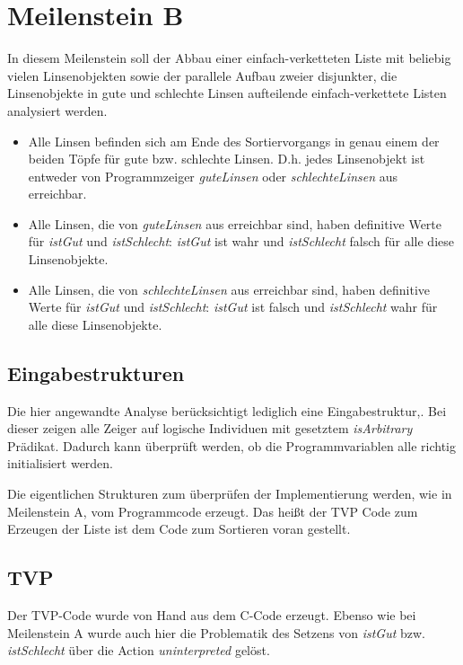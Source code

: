 \section{Meilenstein B}
In diesem Meilenstein soll der Abbau einer einfach-verketteten Liste mit beliebig vielen Linsenobjekten sowie der parallele Aufbau zweier disjunkter, die Linsenobjekte in gute und schlechte Linsen aufteilende einfach-verkettete Listen analysiert werden.
\begin{itemize}
	\item Alle Linsen befinden sich am Ende des Sortiervorgangs in genau einem der beiden Töpfe für gute bzw. schlechte Linsen. D.h. jedes Linsenobjekt ist entweder von Programmzeiger \emph{guteLinsen} oder \emph{schlechteLinsen} aus erreichbar.
	\item Alle Linsen, die von \emph{guteLinsen} aus erreichbar sind, haben definitive Werte für \emph{istGut} und \emph{istSchlecht}: \emph{istGut} ist wahr und \emph{istSchlecht} falsch für alle diese Linsenobjekte.
	\item Alle Linsen, die von \emph{schlechteLinsen} aus erreichbar sind, haben definitive Werte für \emph{istGut} und \emph{istSchlecht}: \emph{istGut} ist falsch und \emph{istSchlecht} wahr für alle diese Linsenobjekte.
\end{itemize}


\subsection{Eingabestrukturen}
Die hier angewandte Analyse berücksichtigt lediglich eine Eingabestruktur,.
Bei dieser zeigen alle Zeiger auf logische Individuen mit gesetztem \emph{isArbitrary} Prädikat. Dadurch kann überprüft werden, ob die Programmvariablen alle richtig initialisiert werden.

Die eigentlichen Strukturen zum überprüfen der Implementierung werden, wie in Meilenstein A, vom Programmcode erzeugt. Das heißt der TVP Code zum Erzeugen der Liste ist dem Code zum Sortieren voran gestellt.

\subsection{TVP}
Der TVP-Code wurde von Hand aus dem C-Code erzeugt.
Ebenso wie bei Meilenstein A wurde auch hier die Problematik des Setzens von \emph{istGut} bzw. \emph{istSchlecht} über die Action \emph{uninterpreted} gelöst.



